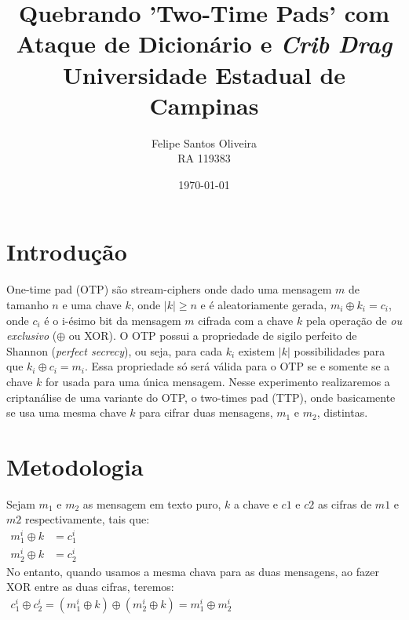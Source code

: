 \documentclass[10pt]{article}
\title{\textbf{Quebrando 'Two-Time Pads' com Ataque de Dicionário e \textit{Crib Drag}}\\
               {\large Universidade Estadual de Campinas}}
\author{Felipe Santos Oliveira\\
        RA 119383}
\date{\today}
\begin{document}
    \maketitle

    \newpage

    \section{Introdução}

        One-time pad (OTP) são stream-ciphers onde dado uma mensagem $m$ de tamanho $n$ e uma chave $k$, onde $|k| \geq n$  
        e é aleatoriamente gerada, $m_i \oplus k_i = c_i$, onde $c_i$ é o i-ésimo bit da mensagem $m$ cifrada com 
        a chave $k$ pela operação de \textit{ou exclusivo} ($\oplus$ ou XOR). O OTP possui a propriedade de sigilo
        perfeito de Shannon (\textit{perfect secrecy}), ou seja, para cada $k_i$ existem $|k|$ possibilidades para
        que $k_i \oplus c_i = m_i$. Essa propriedade só será válida para o OTP se e somente se a chave $k$ for usada
        para uma única mensagem. Nesse experimento realizaremos a criptanálise de uma variante do OTP, o two-times
        pad (TTP), onde basicamente se usa uma mesma chave $k$ para cifrar duas mensagens, $m_1$ e $m_2$, distintas.

    \section{Metodologia}

        Sejam $m_1$ e $m_2$ as mensagem em texto puro, $k$ a chave e $c1$ e $c2$ as cifras de $m1$ e $m2$ respectivamente,
        tais que: \\

        \(
            \begin{aligned}
                m^i_{1} \oplus k &= c^i_{1} \\
                m^i_{2} \oplus k &= c^i_{2}
            \end{aligned}
        \) \\

        No entanto, quando usamos a mesma chava para as duas mensagens, ao fazer XOR entre as duas cifras,
        teremos: \\

        \(
            \begin{aligned}
                c^i_1 \oplus c^i_2 = (m^i_1 \oplus k) \oplus (m^i_2 \oplus k) = m^i_1 \oplus m^i_2
            \end{aligned}
        \) \\
\end{document}

